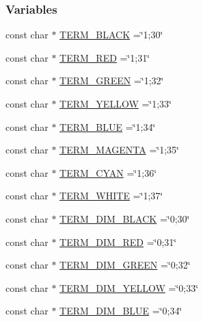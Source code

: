 \subsubsection*{Variables}
\begin{DoxyCompactItemize}
\item 
const char $\ast$ \hyperlink{namespacemappel_a448ca8ea08b3b9cdf522884ac004d901}{T\+E\+R\+M\+\_\+\+B\+L\+A\+CK} =\char`\"{}1;30\char`\"{}
\item 
const char $\ast$ \hyperlink{namespacemappel_ab22998f4999661d300fe1f1e2bc615a2}{T\+E\+R\+M\+\_\+\+R\+ED} =\char`\"{}1;31\char`\"{}
\item 
const char $\ast$ \hyperlink{namespacemappel_a7beb463b118be1cd8c591eaf053d7f5c}{T\+E\+R\+M\+\_\+\+G\+R\+E\+EN} =\char`\"{}1;32\char`\"{}
\item 
const char $\ast$ \hyperlink{namespacemappel_ae85ff1ec27541515a29ca8b7301866dd}{T\+E\+R\+M\+\_\+\+Y\+E\+L\+L\+OW} =\char`\"{}1;33\char`\"{}
\item 
const char $\ast$ \hyperlink{namespacemappel_a04365b9f87e9c572c79e2da4ff4a0378}{T\+E\+R\+M\+\_\+\+B\+L\+UE} =\char`\"{}1;34\char`\"{}
\item 
const char $\ast$ \hyperlink{namespacemappel_a2b80f7559dbf8fd1650220f75db541b2}{T\+E\+R\+M\+\_\+\+M\+A\+G\+E\+N\+TA} =\char`\"{}1;35\char`\"{}
\item 
const char $\ast$ \hyperlink{namespacemappel_ad7696c53e61084d23f8532598b261c36}{T\+E\+R\+M\+\_\+\+C\+Y\+AN} =\char`\"{}1;36\char`\"{}
\item 
const char $\ast$ \hyperlink{namespacemappel_aa0d4a391df8c98076fb8d02fe34ce24c}{T\+E\+R\+M\+\_\+\+W\+H\+I\+TE} =\char`\"{}1;37\char`\"{}
\item 
const char $\ast$ \hyperlink{namespacemappel_a233d1d0ed4c3957ba68364c5d9f6f45e}{T\+E\+R\+M\+\_\+\+D\+I\+M\+\_\+\+B\+L\+A\+CK} =\char`\"{}0;30\char`\"{}
\item 
const char $\ast$ \hyperlink{namespacemappel_ad0396f6c4c69571a8d774588bfd6a1bd}{T\+E\+R\+M\+\_\+\+D\+I\+M\+\_\+\+R\+ED} =\char`\"{}0;31\char`\"{}
\item 
const char $\ast$ \hyperlink{namespacemappel_af35fa592f92c75d4190e1b5aff9fbcfe}{T\+E\+R\+M\+\_\+\+D\+I\+M\+\_\+\+G\+R\+E\+EN} =\char`\"{}0;32\char`\"{}
\item 
const char $\ast$ \hyperlink{namespacemappel_af34f15f5200f5711a39b0dd715907f61}{T\+E\+R\+M\+\_\+\+D\+I\+M\+\_\+\+Y\+E\+L\+L\+OW} =\char`\"{}0;33\char`\"{}
\item 
const char $\ast$ \hyperlink{namespacemappel_a81976972f9e20d3f3ec3e541302bf465}{T\+E\+R\+M\+\_\+\+D\+I\+M\+\_\+\+B\+L\+UE} =\char`\"{}0;34\char`\"{}

\end{DoxyCompactItemize}
